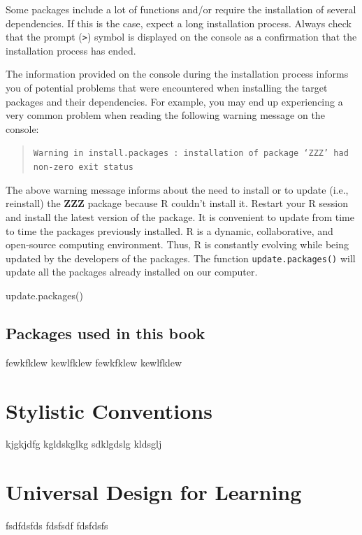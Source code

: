 \documentclass[
]{book}
\newenvironment{Shaded}{\begin{snugshade}}{\end{snugshade}}
\newcommand{\FunctionTok}[1]{\textcolor[rgb]{0.00,0.00,0.00}{#1}}
\newcommand{\NormalTok}[1]{#1}
\theoremstyle{definition}
\theoremstyle{definition}
\theoremstyle{definition}
\theoremstyle{definition}
\theoremstyle{remark}
\begin{document}
Some packages include a lot of functions and/or require the installation of several dependencies. If this is the case, expect a long installation process. Always check that the prompt (\texttt{\textgreater{}}) symbol is displayed on the console as a confirmation that the installation process has ended.

The information provided on the console during the installation process informs you of potential problems that were encountered when installing the target packages and their dependencies. For example, you may end up experiencing a very common problem when reading the following warning message on the console:

\begin{quote}
\texttt{Warning\ in\ install.packages\ :\ installation\ of\ package\ ‘ZZZ’\ had\ non-zero\ exit\ status}
\end{quote}

The above warning message informs about the need to install or to update (i.e., reinstall) the \textbf{ZZZ} package because R couldn't install it. Restart your R session and install the latest version of the package. It is convenient to update from time to time the packages previously installed. R is a dynamic, collaborative, and open-source computing environment. Thus, R is constantly evolving while being updated by the developers of the packages. The function \texttt{update.packages()} will update all the packages already installed on our computer.

\begin{Shaded}
\begin{Highlighting}[]

\FunctionTok{update.packages}\NormalTok{()}
\end{Highlighting}
\end{Shaded}

\pagebreak

\hypertarget{appenA3}{%
\section{Packages used in this book}\label{appenA3}}

fewkfklew kewlfklew fewkfklew kewlfklew

\pagebreak

\hypertarget{appenB}{%
\chapter{Stylistic Conventions}\label{appenB}}

kjgkjdfg kgldskglkg
sdklgdslg
kldsglj

\newpage

\hypertarget{appenC}{%
\chapter{Universal Design for Learning}\label{appenC}}

fsdfdsfds fdsfsdf fdsfdsfs

  
\end{document}
